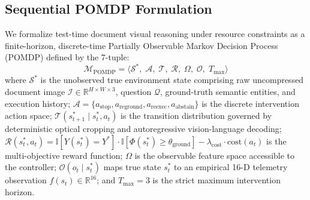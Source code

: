 \documentclass[11pt]{article}
\begin{document}
\subsection{Sequential POMDP Formulation}
We formalize test-time document visual reasoning under resource constraints as a finite-horizon, discrete-time Partially Observable Markov Decision Process (POMDP) defined by the 7-tuple:
\begin{equation}
\mathcal{M}_{\text{POMDP}} = \big\langle \mathcal{S}^*,\; \mathcal{A},\; \mathcal{T},\; \mathcal{R},\; \Omega,\; \mathcal{O},\; T_{\max} \big\rangle
\end{equation}
where $\mathcal{S}^*$ is the unobserved true environment state comprising raw uncompressed document image $\mathcal{I} \in \mathbb{R}^{H \times W \times 3}$, question $\mathcal{Q}$, ground-truth semantic entities, and execution history; $\mathcal{A} = \{a_{\text{stop}}, a_{\text{reground}}, a_{\text{reexec}}, a_{\text{abstain}}\}$ is the discrete intervention action space; $\mathcal{T}(s^*_{t+1} \mid s^*_t, a_t)$ is the transition distribution governed by deterministic optical cropping and autoregressive vision-language decoding; $\mathcal{R}(s^*_t, a_t) = \mathbb{I}[Y(s^*_t) = Y^*] \cdot \mathbb{I}[\Phi(s^*_t) \ge \theta_{\text{ground}}] - \lambda_{\text{cost}} \cdot \text{cost}(a_t)$ is the multi-objective reward function; $\Omega$ is the observable feature space accessible to the controller; $\mathcal{O}(o_t \mid s^*_t)$ maps true state $s^*_t$ to an empirical 16-D telemetry observation $f(s_t) \in \mathbb{R}^{16}$; and $T_{\max} = 3$ is the strict maximum intervention horizon.
\end{document}
